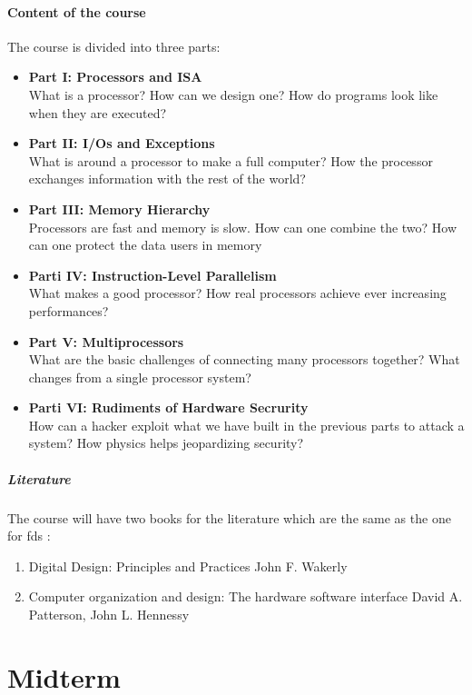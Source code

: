 \documentclass{book}
\begin{document}
\subsection*{Content of the course}
The course is divided into three parts:
\begin{itemize}
	\item \textbf{Part I: Processors and ISA}  \\ What is a processor? How can we design one? How do programs look like when they are executed? 
	\item \textbf{Part II: I/Os and Exceptions} \\ What is around a processor to make a full computer? How the processor exchanges information with the rest of the world? 
	\item \textbf{Part III: Memory Hierarchy} \\ Processors are fast and memory is slow. How can one combine the two? How can one protect the data users in memory
	\item \textbf{Parti IV: Instruction-Level Parallelism} \\ What makes a good processor? How real processors achieve ever increasing performances? 
	\item \textbf{Part V: Multiprocessors} \\ What are the basic challenges of connecting many processors together? What changes from a single processor system? 
	\item \textbf{Parti VI: Rudiments of Hardware Secrurity} \\ How can a hacker exploit what we have built in the previous parts to attack a system? How physics helps jeopardizing security?
\end{itemize}
\subsubsection*{Literature}
The course will have two books for the literature which are the same as the one for fds :
\begin{enumerate}
    \item Digital Design: Principles and Practices John F. Wakerly 
    \item Computer organization and design: The hardware software interface David A. Patterson, John L. Hennessy
\end{enumerate}

\part{Midterm}
\end{document}
